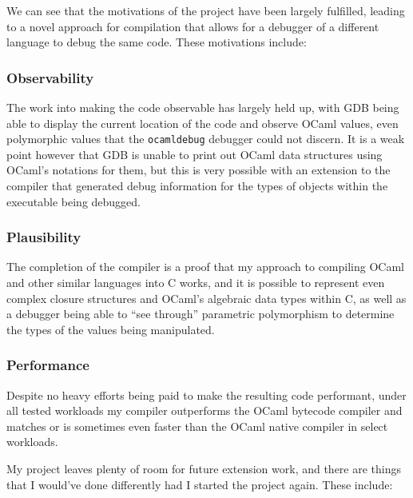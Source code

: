 We can see that the motivations of the project have been largely fulfilled,
leading to a novel approach for compilation that allows for a debugger of a
different language to debug the same code. These motivations include:

\subsubsection{Observability}
The work into making the code observable has largely held up, with GDB being 
able to display the current location of the code and observe OCaml values, even 
polymorphic values that the \texttt{ocamldebug} debugger could not discern. It 
is a weak point however that GDB is unable to print out OCaml data structures 
using OCaml's notations for them, but this is very possible with an extension 
to the compiler that generated debug information for the types of objects 
within the executable being debugged.

\subsubsection{Plausibility}
The completion of the compiler is a proof that my approach to compiling OCaml 
and other similar languages into C works, and it is possible to represent even 
complex closure structures and OCaml's algebraic data types within C, as well 
as a debugger being able to ``see through'' parametric polymorphism to 
determine the types of the values being manipulated.

\subsubsection{Performance}
Despite no heavy efforts being paid to make the resulting code performant, 
under all tested workloads my compiler outperforms the OCaml bytecode compiler 
and matches or is sometimes even faster than the OCaml native compiler in 
select workloads.

My project leaves plenty of room for future extension work, and there are 
things that I would've done differently had I started the project again. These 
include:

